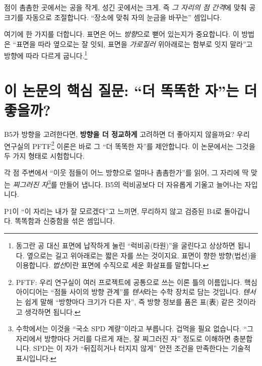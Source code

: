 \documentclass[11pt]{article}
\begin{document}
\begin{description}[leftmargin=0em,style=nextline]
  \item[\textmd{\textbf{B4 — 밀도 적응(density)}}]
  점이 촘촘한 곳에서는 공을 작게, 성긴 곳에서는 크게. 즉 \emph{그 자리의 점 간격}에
  맞춰 공 크기를 자동으로 조절합니다. ``장소에 맞춰 자의 눈금을 바꾸는'' 셈입니다.
  \item[\textmd{\textbf{B5 — 법선 이방성(normal-anisotropic)}}]
  여기에 한 가지를 더합니다. 표면은 어느 \emph{방향}으로 뻗어 있는지가 중요합니다.
  이 방법은 ``표면을 따라 옆으로는 잘 잇되, 표면을 \emph{가로질러} 위아래로는 함부로
  잇지 말라''고 방향에 따라 다르게 굽니다.\footnote{동그란 공 대신 표면에 납작하게 눌린
  ``럭비공(타원)''을 굴린다고 상상하면 됩니다. 옆으로는 길고 위아래로는 짧은 자를 쓰는
  것이지요. 표면이 향한 방향(법선)을 이용합니다. \emph{법선}이란 표면에 수직으로 세운
  화살표를 말합니다.}
\end{description}

\section{이 논문의 핵심 질문: ``더 똑똑한 자''는 더 좋을까?}

B5가 방향을 고려한다면, \textbf{방향을 더 정교하게} 고려하면 더 좋아지지 않을까요?
우리 연구실의 PFTF\footnote{PFTF: 우리 연구실이 여러 프로젝트에 공통으로 쓰는 이론
틀의 이름입니다. 핵심 아이디어는 ``점들 사이의 방향 관계''를 \emph{텐서}라는 수학
장치로 담는 것입니다. \emph{텐서}는 쉽게 말해 ``방향마다 크기가 다른 자'', 즉 방향
정보를 품은 표(表) 같은 것이라고 생각하면 됩니다.} 이론은 바로 그 ``더 똑똑한 자''를
제안합니다. 이 논문에서는 그것을 두 가지 형태로 시험합니다.

\begin{description}[leftmargin=0em,style=nextline]
  \item[\textmd{\textbf{P1 — 국소적으로 방향을 정교하게 굽는 자}}]
  각 점 주변에서 ``이웃 점들이 어느 방향으로 얼마나 촘촘한가''를 읽어, 그 자리에 딱 맞는
  \emph{찌그러진 자}\footnote{수학에서는 이것을 ``국소 SPD 계량''이라고 부릅니다. 겁먹을
  필요 없습니다. ``그 자리에서 방향마다 거리를 다르게 재는, 잘 찌그러진 자'' 정도로
  이해하면 충분합니다. SPD는 이 자가 ``뒤집히거나 터지지 않게'' 안전 조건을 만족한다는
  기술적 표시입니다.}를 만들어 냅니다. B5의 럭비공보다 더 자유롭게 기울고 늘어나는 자입니다.
  \item[\textmd{\textbf{P2 — 자신 없으면 안전하게 물러서는 자}}]
  P1이 ``이 자리는 내가 잘 모르겠다''고 느끼면, 무리하지 않고 검증된 B4로 돌아갑니다.
  똑똑함과 신중함을 섞은 셈입니다.
\end{description}
\end{document}
